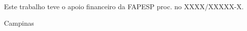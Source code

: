 \thispagestyle{empty}

\begin{center}
{\huge {\sc \autor } }
\end{center}

\vspace{7cm}

\begin{center}
{\huge {\sc \titulo} }
\end{center}

\vspace{9cm}

\begin{center}
    {\Large Este trabalho teve o apoio financeiro
    da FAPESP
    proc. no
    XXXX/XXXXX-X.
    }
\end{center}

\vspace{1cm}

\begin{center}
    {\Large {\sc Campinas \\ \ano} }
\end{center}
